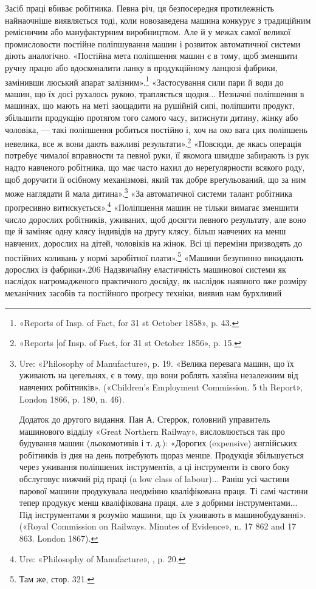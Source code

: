 Засіб праці вбиває робітника. Певна річ, ця безпосередня
протилежність найнаочніше виявляється тоді, коли новозаведена
машина конкурує з традиційним ремісничим або мануфактурним
виробництвом. Але й у межах самої великої промисловости постійне
поліпшування машин і розвиток автоматичної системи діють аналогічно.
«Постійна мета поліпшення машин є в тому, щоб зменшити
ручну працю або вдосконалити ланку в продукційному
ланцюзі фабрики, замінивши люський апарат залізним».\footnote{
«Reports of Insp. of Fact, for 31 st October 1858», p. 43.
}
«Застосування сили пари й води до машин, що їх досі рухалось
рукою, трапляється щодня... Незначні поліпшення в машинах,
що мають на меті заощадити на рушійній сипі, поліпшити продукт,
збільшити продукцію протягом того самого часу, витиснути дитину,
жінку або чоловіка, — такі поліпшення робиться постійно
і, хоч на око вага цих поліпшень невелика, все ж вони дають
важливі результати».\footnote{
«Reports |of Insp. of Fact, for 31 st October 1856», p. 15.
} «Повсюди, де якась операція потребує
чималої вправности та певної руки, її якомога швидше забирають
із рук надто навченого робітника, що має часто нахил до нереґулярности
всякого роду, щоб доручити її осібному механізмові,
який так добре вреґульований, що за ним може наглядати й
мала дитина».\footnote{
Ure: «Philosophy of Manufacture», p. 19. «Велика перевага
машин, що їх уживають на цегельнях, є в тому, що вони роблять хазяїна
незалежним від навчених робітників». («Children’s Employment Commission.
5 th Report», London 1866, p. 180, n. 46).

Додаток до другого видання. Пан А. Стеррок, головний управитель
машинового відділу «Great Northern Railway», висловлюється так про
будування машин (льокомотивів і т. д.): «Дорогих (expensive) англійських
робітників із дня на день потребують щораз менше. Продукція збільшується
через уживання поліпшених інструментів, а ці інструменти із свого
боку обслуговує нижчий рід праці (a low class of labour)... Раніш усі частини
парової машини продукувала неодмінно кваліфікована праця.
Ті самі частини тепер продукує менш кваліфікована праця, але з добрими
інструментами... Під інструментами я розумію машини, що їх уживають
в машинобудуванні». («Royal Commission on Railways. Minutes of Evidence»,
n. 17 862 and 17 863. London 1867).
} «За автоматичної системи талант робітника проґресивно
витискується».\footnote{
Ure: «Philosophy of Manufacture», , p. 20.
} «Поліпшення машин не тільки вимагає
зменшити число дорослих робітників, уживаних, щоб досягти
певного результату, але воно ще й заміняє одну клясу індивідів
на другу клясу, більш навчених на менш навчених, дорослих
на дітей, чоловіків на жінок. Всі ці переміни призводять до постійних
коливань у нормі заробітної плати».\footnote{
Там же, стор. 321.
} «Машини безупинно
викидають дорослих із фабрики».206 Надзвичайну еластичність
машинової системи як наслідок нагромадженого практичного
досвіду, як наслідок наявного вже розміру механічних
засобів та постійного проґресу техніки, виявив нам бурхливий

